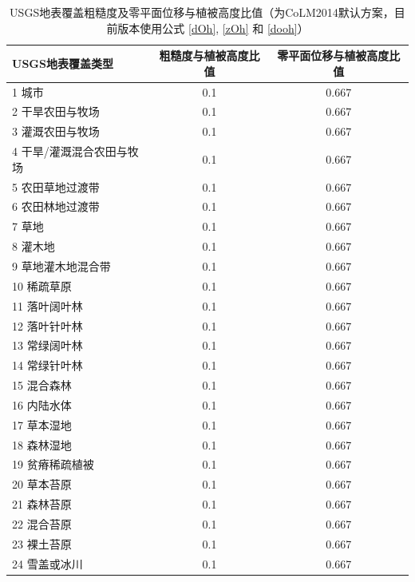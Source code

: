 \begin{table}[htbp]
\centering
\caption[USGS地表覆盖粗糙度及零平面位移与植被高度比值]{USGS地表覆盖粗糙度及零平面位移与植被高度比值（为CoLM2014默认方案，目前版本使用公式 \eqref{dOh}, \eqref{zOh} 和 \eqref{dooh}）}
\label{tab:USGS地表覆盖粗糙度及零平面位移与植被高度比值}
\begin{tabular}{@{}lcc@{}}
\toprule
USGS地表覆盖类型     & 粗糙度与植被高度比值 & 零平面位移与植被高度比值 \\ \midrule
1 城市           & 0.1        & 0.667        \\
2 干旱农田与牧场      & 0.1        & 0.667        \\
3 灌溉农田与牧场      & 0.1        & 0.667        \\
4 干旱/灌溉混合农田与牧场 & 0.1        & 0.667        \\
5 农田草地过渡带      & 0.1        & 0.667        \\
6 农田林地过渡带      & 0.1        & 0.667        \\
7 草地           & 0.1        & 0.667        \\
8 灌木地          & 0.1        & 0.667        \\
9 草地灌木地混合带     & 0.1        & 0.667        \\
10 稀疏草原        & 0.1        & 0.667        \\
11 落叶阔叶林       & 0.1        & 0.667        \\
12 落叶针叶林       & 0.1        & 0.667        \\
13 常绿阔叶林       & 0.1        & 0.667        \\
14 常绿针叶林       & 0.1        & 0.667        \\
15 混合森林        & 0.1        & 0.667        \\
16 内陆水体        & 0.1        & 0.667        \\
17 草本湿地        & 0.1        & 0.667        \\
18 森林湿地        & 0.1        & 0.667        \\
19 贫瘠稀疏植被      & 0.1        & 0.667        \\
20 草本苔原        & 0.1        & 0.667        \\
21 森林苔原        & 0.1        & 0.667        \\
22 混合苔原        & 0.1        & 0.667        \\
23 裸土苔原        & 0.1        & 0.667        \\
24 雪盖或冰川       & 0.1        & 0.667        \\ \bottomrule
\end{tabular}
\end{table}


